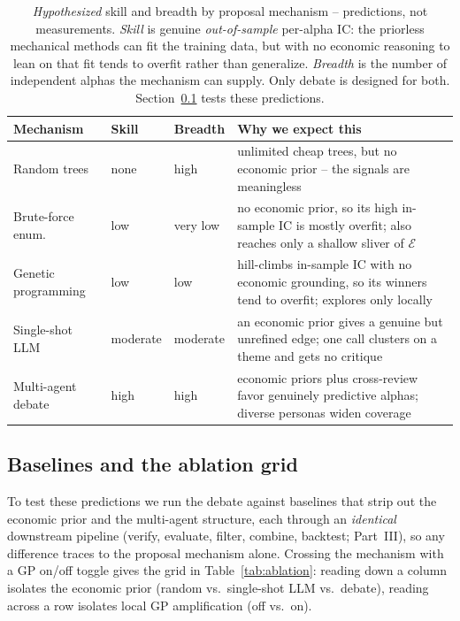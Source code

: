 \documentclass[11pt]{article}
\theoremstyle{definition}
\theoremstyle{plain}
\theoremstyle{remark}
\newcommand{\Expr}{\mathcal{E}}
\newcommand{\IC}{\mathrm{IC}}
\begin{document}
\begin{table}[h]
\centering
\small
\begin{tabular}{@{}p{2.9cm}p{1.4cm}p{1.7cm}p{7.4cm}@{}}
\toprule
Mechanism & Skill & Breadth & Why we expect this \\
\midrule
Random trees        & none     & high     & unlimited cheap trees, but no economic prior -- the signals are meaningless \\
Brute-force enum.\  & low      & very low & no economic prior, so its high in-sample $\IC$ is mostly overfit; also reaches only a shallow sliver of $\Expr$ \\
Genetic programming & low      & low      & hill-climbs in-sample $\IC$ with no economic grounding, so its winners tend to overfit; explores only locally \\
Single-shot LLM     & moderate & moderate & an economic prior gives a genuine but unrefined edge; one call clusters on a theme and gets no critique \\
Multi-agent debate  & high     & high     & economic priors plus cross-review favor genuinely predictive alphas; diverse personas widen coverage \\
\bottomrule
\end{tabular}
\caption{\emph{Hypothesized} skill and breadth by proposal mechanism -- predictions, not
measurements. \emph{Skill} is genuine \emph{out-of-sample} per-alpha $\IC$: the priorless
mechanical methods can fit the training data, but with no economic reasoning to lean on that fit
tends to overfit rather than generalize. \emph{Breadth} is the number of independent alphas the
mechanism can supply. Only debate is designed for both. Section~\ref{sec:baselines} tests these
predictions.}
\label{tab:skillbreadth}
\end{table}

\subsection{Baselines and the ablation grid}
\label{sec:baselines}

To test these predictions we run the debate against baselines that strip out the economic prior
and the multi-agent structure, each through an \emph{identical} downstream pipeline (verify,
evaluate, filter, combine, backtest; Part~III), so any difference traces to the proposal mechanism
alone. Crossing the mechanism with a GP on/off toggle gives the grid in Table~\ref{tab:ablation}:
reading down a column isolates the economic prior (random vs.\ single-shot LLM vs.\ debate),
reading across a row isolates local GP amplification (off vs.\ on).
\end{document}

